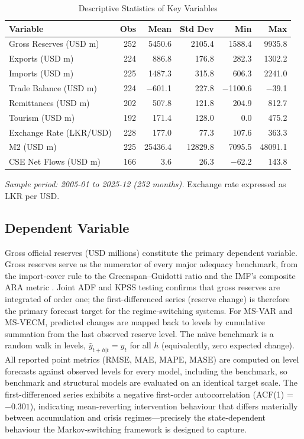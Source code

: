 \documentclass[12pt,a4paper]{article}
\begin{document}
\begin{table}[htbp]
\centering
\caption{Descriptive Statistics of Key Variables}
\label{tab:descriptive}
\begin{tabular}{lrrrrr}
\toprule
Variable & Obs & Mean & Std Dev & Min & Max \\
\midrule
Gross Reserves (USD m) & 252 & 5450.6 & 2105.4 & 1588.4 & 9935.8 \\
Exports (USD m) & 224 & 886.8 & 176.8 & 282.3 & 1302.2 \\
Imports (USD m) & 225 & 1487.3 & 315.8 & 606.3 & 2241.0 \\
Trade Balance (USD m) & 224 & $-$601.1 & 227.8 & $-$1100.6 & $-$39.1 \\
Remittances (USD m) & 202 & 507.8 & 121.8 & 204.9 & 812.7 \\
Tourism (USD m) & 192 & 171.4 & 128.0 & 0.0 & 475.2 \\
Exchange Rate (LKR/USD) & 228 & 177.0 & 77.3 & 107.6 & 363.3 \\
M2 (USD m) & 225 & 25436.4 & 12829.8 & 7095.5 & 48091.1 \\
CSE Net Flows (USD m) & 166 & 3.6 & 26.3 & $-$62.2 & 143.8 \\
\bottomrule
\end{tabular}
\begin{tablenotes}
\small
\item \textit{Sample period: 2005-01 to 2025-12 (252 months).} Exchange rate expressed as LKR per USD.
\end{tablenotes}
\end{table}

\subsection{Dependent Variable}

Gross official reserves (USD millions) constitute the primary dependent variable. Gross reserves serve as the numerator of every major adequacy benchmark, from the import-cover rule to the Greenspan--Guidotti ratio and the IMF's composite ARA metric \citep{JeanneRanciere2011,Obstfeld2010}. Joint ADF and KPSS testing confirms that gross reserves are integrated of order one; the first-differenced series (reserve change) is therefore the primary forecast target for the regime-switching systems. For MS-VAR and MS-VECM, predicted changes are mapped back to levels by cumulative summation from the last observed reserve level. The na\"{\i}ve benchmark is a random walk in levels, $\hat{y}_{t+h|t}=y_t$ for all $h$ (equivalently, zero expected change). All reported point metrics (RMSE, MAE, MAPE, MASE) are computed on level forecasts against observed levels for every model, including the benchmark, so benchmark and structural models are evaluated on an identical target scale. The first-differenced series exhibits a negative first-order autocorrelation (ACF(1) = $-0.301$), indicating mean-reverting intervention behaviour that differs materially between accumulation and crisis regimes---precisely the state-dependent behaviour the Markov-switching framework is designed to capture.
\end{document}
